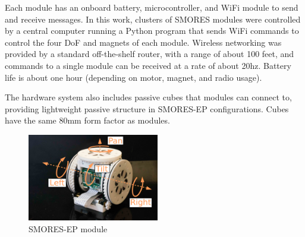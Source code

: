 \documentclass[journal]{IEEEtran}
\begin{document}
Each module has an onboard battery, microcontroller, and WiFi
module to send and receive messages.  In this work, clusters of SMORES
modules were controlled by a central computer running a Python program that
sends WiFi commands to control the four DoF and magnets of each module.
Wireless networking was provided by a standard off-the-shelf  router, with a range of about 100 feet, and commands to a single module can be received at a rate of about 20hz.
Battery life is about one hour (depending on motor, magnet, and radio usage).

The hardware system also includes passive cubes that modules can connect to, providing lightweight passive structure in SMORES-EP configurations.  Cubes have the same 80mm form factor as modules.
%
\begin{figure}   
\begin{center}
\includegraphics[height=1.5in]{images/smores_dof.pdf}
\end{center}
\caption{SMORES-EP module}
\label{fig:smores-module}
\end{figure}
%
\end{document}
